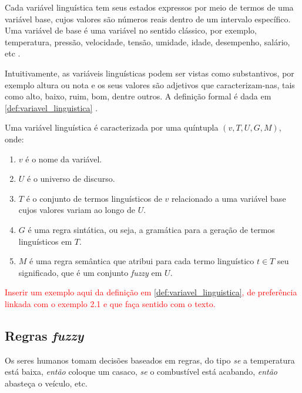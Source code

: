 Cada variável linguística tem seus estados expressos por meio de termos de uma variável base, cujos valores são números reais dentro de um intervalo específico. Uma variável de base é uma variável no sentido clássico, por exemplo, temperatura, pressão, velocidade, tensão, umidade, idade, desempenho, salário, etc \citep{klir:95}.

Intuitivamente, as variáveis linguísticas  podem ser vistas como substantivos, por exemplo altura ou nota e os seus valores são adjetivos que caracterizam-nas, tais como alto, baixo, ruim, bom, dentre outros. A definição formal é dada em \ref{def:variavel_linguistica} \citep{zadeh:75, klir:95}.

\begin{defn}
\label{def:variavel_linguistica}
Uma variável linguística é caracterizada por uma quíntupla $(v, T, U, G, M)$, onde:

\begin{enumerate}[label=(\roman*)]
\item $v$ é o nome da variável.
\item $U$ é o universo de discurso.
\item $T$ é o conjunto de termos linguísticos de $v$ relacionado a uma variável base cujos valores variam ao longo de $U$.
\item $G$ é uma regra sintática, ou seja, a gramática para a geração de termos linguísticos em $T$.
\item $M$ é uma regra semântica que atribui para cada termo linguístico $t \in T$ seu significado, que é um conjunto \emph{fuzzy} em $U$.
\end{enumerate}
\end{defn}

\begin{exmp}
\textcolor{red}{Inserir um exemplo aqui da definição em \ref{def:variavel_linguistica}, de preferência linkada com o exemplo 2.1 e que faça sentido com o texto.}
\end{exmp}


\subsection{Regras \emph{fuzzy}}
\label{sec:regras_fuzzy}
Os seres humanos tomam decisões baseados em regras, do tipo \emph{se} a temperatura está baixa, \emph{então} coloque um casaco, \emph{se} o combustível está acabando, \emph{então} abasteça o veículo, etc.

